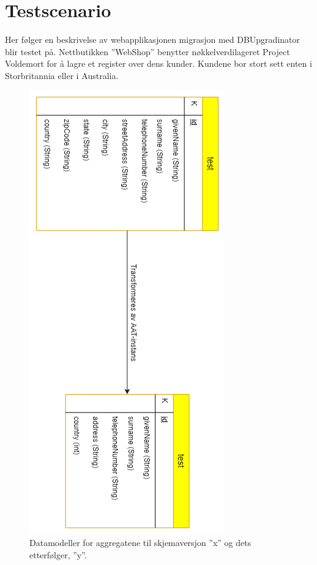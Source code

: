 \section{Testscenario}

Her følger en beskrivelse av webapplikasjonen migrasjon med DBUpgradinator blir testet på. Nettbutikken ''WebShop'' benytter nøkkelverdi\-lageret Project Voldemort for å lagre et register over dens kunder. Kundene bor stort sett enten i Storbritannia eller i Australia.

\begin{figure}[hbtp]
    \centering
    \includegraphics[scale=0.6]{fig/WSS-AggregatModell.png}
    \caption{Datamodeller for aggregatene til skjemaversjon ''x'' og dets etterfølger, ''y''.}
    \label{fig11}
\end{figure}

